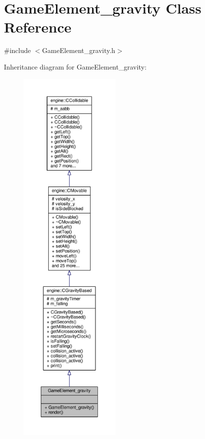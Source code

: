 \hypertarget{classGameElement__gravity}{\section{Game\-Element\-\_\-gravity Class Reference}
\label{classGameElement__gravity}
}


{\ttfamily \#include $<$Game\-Element\-\_\-gravity.\-h$>$}



Inheritance diagram for Game\-Element\-\_\-gravity\-:\nopagebreak
\begin{figure}[H]
\begin{center}
\leavevmode
\includegraphics[height=550pt]{classGameElement__gravity__inherit__graph}
\end{center}
\end{figure}


